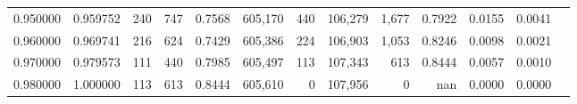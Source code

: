 \begin{tabular}{rrrrrrrrrrrrr}
0.950000 & 0.959752 &    240 &   747 &                                     0.7568 & 605,170 &     440 & 106,279 &   1,677 & 0.7922 & 0.0155 & 0.0041 \\
0.960000 & 0.969741 &    216 &   624 &                                     0.7429 & 605,386 &     224 & 106,903 &   1,053 & 0.8246 & 0.0098 & 0.0021 \\
0.970000 & 0.979573 &    111 &   440 &                                     0.7985 & 605,497 &     113 & 107,343 &     613 & 0.8444 & 0.0057 & 0.0010 \\
0.980000 & 1.000000 &    113 &   613 &                                     0.8444 & 605,610 &       0 & 107,956 &       0 &    nan & 0.0000 & 0.0000 \\
\bottomrule
\end{tabular}
